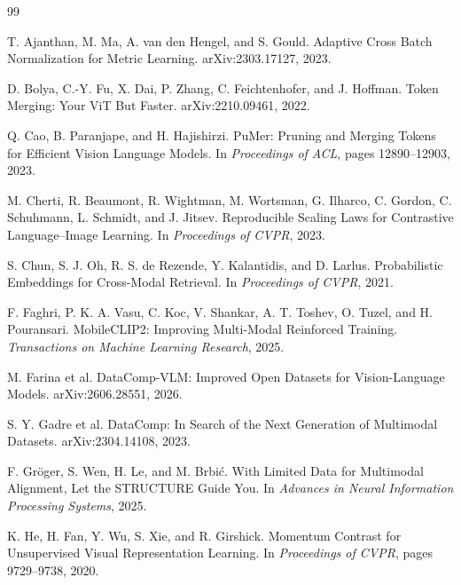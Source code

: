 \documentclass[11pt,a4paper,oneside]{report}
\begin{document}
\clearpage
{}
\begin{thebibliography}{99}

T. Ajanthan, M. Ma, A. van den Hengel, and S. Gould.
\newblock Adaptive Cross Batch Normalization for Metric Learning.
\newblock arXiv:2303.17127, 2023.

D. Bolya, C.-Y. Fu, X. Dai, P. Zhang, C. Feichtenhofer, and J. Hoffman.
\newblock Token Merging: Your ViT But Faster.
\newblock arXiv:2210.09461, 2022.

Q. Cao, B. Paranjape, and H. Hajishirzi.
\newblock PuMer: Pruning and Merging Tokens for Efficient Vision Language Models.
\newblock In \emph{Proceedings of ACL}, pages 12890--12903, 2023.

M. Cherti, R. Beaumont, R. Wightman, M. Wortsman, G. Ilharco, C. Gordon,
C. Schuhmann, L. Schmidt, and J. Jitsev.
\newblock Reproducible Scaling Laws for Contrastive Language--Image Learning.
\newblock In \emph{Proceedings of CVPR}, 2023.

S. Chun, S. J. Oh, R. S. de Rezende, Y. Kalantidis, and D. Larlus.
\newblock Probabilistic Embeddings for Cross-Modal Retrieval.
\newblock In \emph{Proceedings of CVPR}, 2021.

F. Faghri, P. K. A. Vasu, C. Koc, V. Shankar, A. T. Toshev, O. Tuzel, and
H. Pouransari.
\newblock MobileCLIP2: Improving Multi-Modal Reinforced Training.
\newblock \emph{Transactions on Machine Learning Research}, 2025.

M. Farina et al.
\newblock DataComp-VLM: Improved Open Datasets for Vision-Language Models.
\newblock arXiv:2606.28551, 2026.

S. Y. Gadre et al.
\newblock DataComp: In Search of the Next Generation of Multimodal Datasets.
\newblock arXiv:2304.14108, 2023.

F. Gr\"oger, S. Wen, H. Le, and M. Brbi\'c.
\newblock With Limited Data for Multimodal Alignment, Let the STRUCTURE Guide You.
\newblock In \emph{Advances in Neural Information Processing Systems}, 2025.

K. He, H. Fan, Y. Wu, S. Xie, and R. Girshick.
\newblock Momentum Contrast for Unsupervised Visual Representation Learning.
\newblock In \emph{Proceedings of CVPR}, pages 9729--9738, 2020.


\end{thebibliography}
\end{document}
